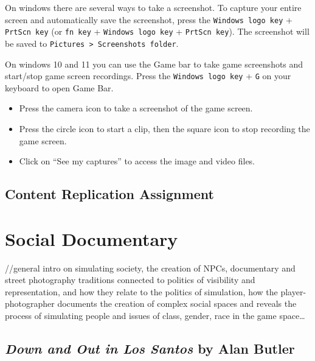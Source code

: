 \documentclass[
  openany]{book}
\begin{document}
On windows there are several ways to take a screenshot. To capture your entire screen and automatically save the screenshot, press the \texttt{Windows\ logo\ key} + \texttt{PrtScn\ key} (or \texttt{fn\ key} + \texttt{Windows\ logo\ key} + \texttt{PrtScn\ key}). The screenshot will be saved to \texttt{Pictures\ \textgreater{}\ Screenshots\ folder}.

On windows 10 and 11 you can use the Game bar to take game screenshots and start/stop game screen recordings. Press the \texttt{Windows\ logo\ key} + \texttt{G} on your keyboard to open Game Bar.

\begin{itemize}
\item
  Press the camera icon to take a screenshot of the game screen.
\item
  Press the circle icon to start a clip, then the square icon to stop recording the game screen.
\item
  Click on ``See my captures'' to access the image and video files.
\end{itemize}

\hypertarget{content-replication-assignment}{%
\section*{Content Replication Assignment}\label{content-replication-assignment}}

\hypertarget{social-documentary}{%
\chapter{Social Documentary}\label{social-documentary}}

//general intro on simulating society, the creation of NPCs, documentary and street photography traditions connected to politics of visibility and representation, and how they relate to the politics of simulation, how the player-photographer documents the creation of complex social spaces and reveals the process of simulating people and issues of class, gender, race in the game space\ldots{}

\hypertarget{down-and-out-in-los-santos-by-alan-butler}{%
\section*{\texorpdfstring{\emph{Down and Out in Los Santos} by Alan Butler}{Down and Out in Los Santos by Alan Butler}}\label{down-and-out-in-los-santos-by-alan-butler}}
\end{document}
